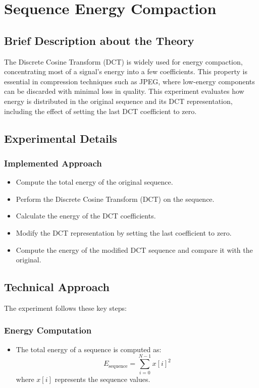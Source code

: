 \documentclass[12pt,a4paper]{article}
\begin{document}
\section{Sequence Energy Compaction}

\subsection{Brief Description about the Theory}
The Discrete Cosine Transform (DCT) is widely used for energy compaction, concentrating most of a signal's energy into a few coefficients. This property is essential in compression techniques such as JPEG, where low-energy components can be discarded with minimal loss in quality. This experiment evaluates how energy is distributed in the original sequence and its DCT representation, including the effect of setting the last DCT coefficient to zero.

\subsection{Experimental Details}
\subsubsection{Implemented Approach}
\begin{itemize}
  \item Compute the total energy of the original sequence.
  \item Perform the Discrete Cosine Transform (DCT) on the sequence.
  \item Calculate the energy of the DCT coefficients.
  \item Modify the DCT representation by setting the last coefficient to zero.
  \item Compute the energy of the modified DCT sequence and compare it with the original.
\end{itemize}

\subsection{Technical Approach}
The experiment follows these key steps:

\subsubsection{Energy Computation}
\begin{itemize}
  \item The total energy of a sequence is computed as:
    \[
      E_{\text{sequence}} = \sum_{i=0}^{N-1} x[i]^2
    \]
    where \( x[i] \) represents the sequence values.
\end{itemize}
\end{document}
